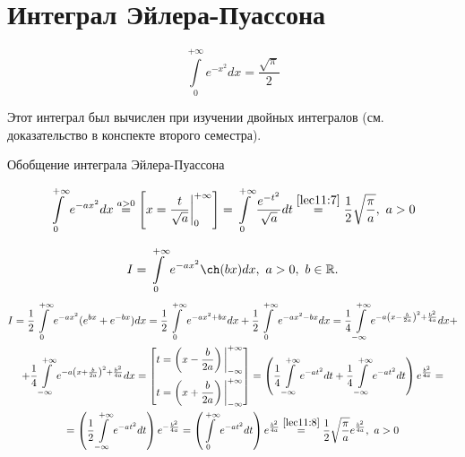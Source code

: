 \documentclass[../../main.tex]{subfiles}
\begin{document}
	\section{Интеграл Эйлера-Пуассона}
	
	\begin{equation}\label{lec11:7}
		\int\limits_0^{+\infty} e^{-x^2} dx = \frac{\sqrt{\pi}}{2}
	\end{equation}
	
	Этот интеграл был вычислен при изучении двойных интегралов (см. 
	доказательство в конспекте второго семестра). 
	
	Обобщение интеграла Эйлера-Пуассона
	
	\begin{equation}\label{lec11:8}
		\int\limits_0^{+\infty} e^{-ax^2} dx \overset{a > 0}{=} \left[ x = 
		\frac{t}{\sqrt{a}} \bigg|_0^{+\infty} \right] = \int\limits_0^{+\infty} 
		\frac{e^{-t^2}}{\sqrt{a}} dt \overset{\eqref{lec11:7}}{=} \frac{1}{2} 
		\sqrt{\frac{\pi}{a}},\ a > 0
	\end{equation}
	
	\begin{exmp}
		\[
		I = \int\limits_0^{+\infty} e^{-ax^2} \ch (bx) dx, 
		\ a > 0,\ b \in \R
		.\]
		\begin{equation*}
			\begin{gathered}
				I = \frac{1}{2} \int\limits_0^{+\infty} e^{-ax^2} (e^{bx} + e^{-bx}) dx = 
				\frac{1}{2} \int\limits_0^{+\infty} e^{-ax^2 + bx} dx + \frac{1}{2} 
				\int\limits_0^{+\infty} e^{-ax^2 - bx} dx = \frac{1}{4} 
				\int\limits_{-\infty}^{+\infty} e^{-a \left( x - \frac{b}{2a} \right)^2 + 
				\frac{b^2}{4a}} dx + \\
				+ \frac{1}{4} \int\limits_{-\infty}^{+\infty} e^{-a \left( x + 
				\frac{b}{2a} \right)^2 + \frac{b^2}{4a}} dx = 
				\left[ 
					\begin{gathered}
						t = \left( x - \frac{b}{2a} \right) \bigg|_{-\infty}^{+\infty} \\
						t = \left( x + \frac{b}{2a} \right) \bigg|_{-\infty}^{+\infty}
					\end{gathered}
				\right] 
				= \left( \frac{1}{4} \int\limits_{-\infty}^{+\infty} e^{-at^2} dt + 
				\frac{1}{4} \int\limits_{-\infty}^{+\infty} e^{-at^2} dt \right) 
				e^{\frac{b^2}{4a}} = \\
				= \left( \frac{1}{2} \int\limits_{-\infty}^{+\infty} e^{-at^2} dt \right) 
				e^{-\frac{b^2}{4a}} = \left( \int\limits_0^{+\infty} e^{-at^2} dt \right) 
				e^{\frac{b^2}{4a}} \overset{\eqref{lec11:8}}{=} \frac{1}{2} 
				\sqrt{\frac{\pi}{a}} e^{\frac{b^2}{4a}}, \ a > 0
			\end{gathered}
		\end{equation*}
	\end{exmp}
\end{document}
